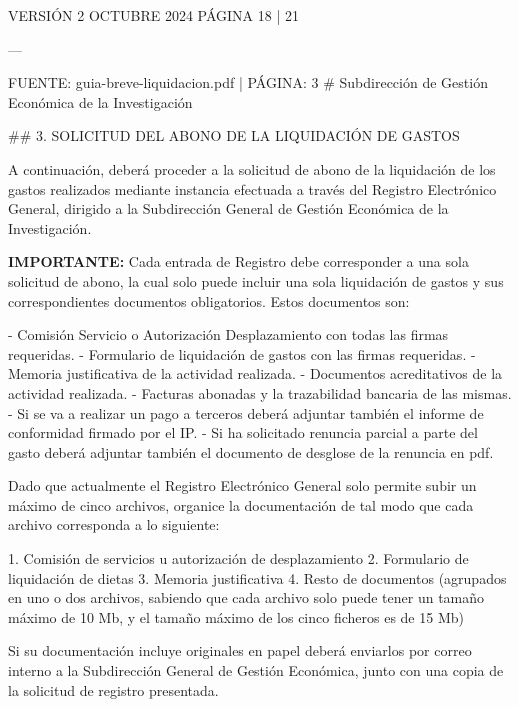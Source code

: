 \documentclass{article}
\begin{document}
\begin{itemize}
\begin{itemize}
\begin{scriptsize}
                  VERSIÓN 2 OCTUBRE 2024 PÁGINA 18 | 21

                  ---

                  FUENTE: guia-breve-liquidacion.pdf | PÁGINA: 3
                  \# Subdirección de Gestión Económica de la Investigación

                  \#\# 3. SOLICITUD DEL ABONO DE LA LIQUIDACIÓN DE GASTOS

                  A continuación, deberá proceder a la solicitud de abono de la liquidación de los gastos realizados mediante instancia efectuada a través del Registro Electrónico General, dirigido a la Subdirección General de Gestión Económica de la Investigación.

                  \textbf{IMPORTANTE:} Cada entrada de Registro debe corresponder a una sola solicitud de abono, la cual solo puede incluir una sola liquidación de gastos y sus correspondientes documentos obligatorios. Estos documentos son:

                  - Comisión Servicio o Autorización Desplazamiento con todas las firmas requeridas.
                  - Formulario de liquidación de gastos con las firmas requeridas.
                  - Memoria justificativa de la actividad realizada.
                  - Documentos acreditativos de la actividad realizada.
                  - Facturas abonadas y la trazabilidad bancaria de las mismas.
                  - Si se va a realizar un pago a terceros deberá adjuntar también el informe de conformidad firmado por el IP.
                  - Si ha solicitado renuncia parcial a parte del gasto deberá adjuntar también el documento de desglose de la renuncia en pdf.

                  Dado que actualmente el Registro Electrónico General solo permite subir un máximo de cinco archivos, organice la documentación de tal modo que cada archivo corresponda a lo siguiente:

                  1. Comisión de servicios u autorización de desplazamiento
                  2. Formulario de liquidación de dietas
                  3. Memoria justificativa
                  4. Resto de documentos (agrupados en uno o dos archivos, sabiendo que cada archivo solo puede tener un tamaño máximo de 10 Mb, y el tamaño máximo de los cinco ficheros es de 15 Mb)

                  Si su documentación incluye originales en papel deberá enviarlos por correo interno a la Subdirección General de Gestión Económica, junto con una copia de la solicitud de registro presentada.


\end{scriptsize}
\end{itemize}
\end{itemize}
\end{document}

